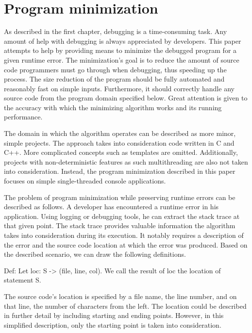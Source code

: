 \chapter{Program minimization}

As described in the first chapter, debugging is a time-consuming task.
Any amount of help with debugging is always appreciated by developers.
This paper attempts to help by providing means to minimize the debugged
program for a given runtime error.
The minimization's goal is to reduce the amount of source code programmers 
must go through when debugging, thus speeding up the process.
The size reduction of the program should be fully automated and reasonably 
fast on simple inputs.
Furthermore, it should correctly handle any source code from the program 
domain specified below.
Great attention is given to the accuracy with which the minimizing algorithm 
works and its running performance.


The domain in which the algorithm operates can be described as more minor, 
simple projects.
The approach takes into consideration code written in C and C++.
More complicated concepts such as templates are omitted.
Additionally, projects with non-deterministic features as such multithreading 
are also not taken into consideration.
Instead, the program minimization described in this paper focuses 
on simple single-threaded console applications.

The problem of program minimization while preserving runtime errors can be 
described as follows.
A developer has encountered a runtime error in his application.
Using logging or debugging tools, he can extract the stack trace at that 
given point.
The stack trace provides valuable information the algorithm takes into 
consideration during its execution.
It notably requires a description of the error and the source code 
location at which the error was produced.
Based on the described scenario, we can draw the following definitions.

Def: Let loc: S -> (file, line, col).
We call the result of loc the location of statement S.

The source code's location is specified by a file name, the line number, and 
on that line, the number of characters from the left.
The location could be described in further detail by including starting and 
ending points.
However, in this simplified description, only the starting point is taken 
into consideration.

